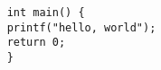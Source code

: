 \documentclass{article}
\begin{document}
    \begin{verbatim}
    int main() {
    printf("hello, world");
    return 0;
    }
    \end{verbatim}
\end{document}
